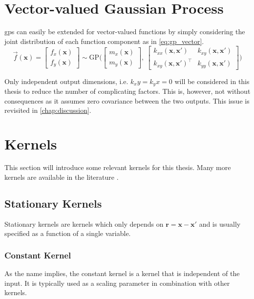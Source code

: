 \section{Vector-valued Gaussian Process}\label{sec:theory_vector_gp}
\acrshort{gp}s can easily be extended for vector-valued functions by simply considering the joint distribution of each function component as in \cref{eq:gp_vector}.
\begin{equation}\label{eq:gp_vector}
     \vec{f}(\boldsymbol{x}) = \begin{bmatrix} f_x (\boldsymbol{x})\\ f_y (\boldsymbol{x})\end{bmatrix} \sim \text{GP} \big(\begin{bmatrix} m_x(\boldsymbol{x})\\m_y(\boldsymbol{x})\end{bmatrix}, \ \begin{bmatrix}
    k_{xx}(\boldsymbol{x}, \boldsymbol{x}') & k_{xy}(\boldsymbol{x}, \boldsymbol{x}') \\ k_{xy}(\boldsymbol{x}, \boldsymbol{x}')^\intercal & k_{yy}(\boldsymbol{x}, \boldsymbol{x}')
    \end{bmatrix}\big) 
\end{equation}

Only independent output dimensions, i.e. $k_xy = k_yx = 0$ will be considered in this thesis to reduce the number of complicating factors. This is, however, not without consequences as it assumes zero covariance between the two outputs. This issue is revisited in \cref{chap:discussion}.

\section{Kernels}\label{sec:kernels}
This section will introduce some relevant kernels for this thesis. Many more kernels are available in the literature \cite{rasmussen}.  
\subsection{Stationary Kernels}
Stationary kernels are kernels which only depends on $\boldsymbol{r} = \boldsymbol{x} - \boldsymbol{x'}$ and is usually specified as a function of a single variable.
\subsubsection{Constant Kernel}
As the name implies, the constant kernel is a kernel that is independent of the input. It is typically used as a scaling parameter in combination with other kernels.

